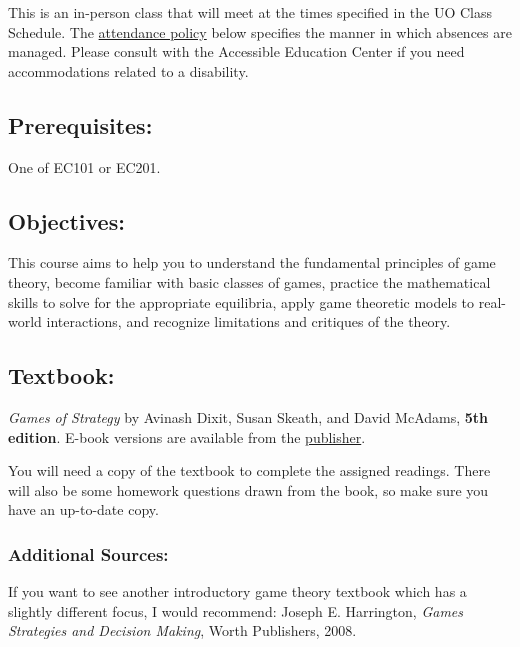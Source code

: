 This is an in-person class that will meet at the times specified in the UO Class Schedule.
The \hyperlink{grade:attendence}{attendance policy} below specifies the manner in which absences are managed.
Please consult with the Accessible Education Center if you need accommodations related to a disability.

\subsection{Prerequisites:}

  One of EC101 or EC201.

\subsection{Objectives:}

This course aims to help you to understand the fundamental principles of game theory, become familiar with basic classes of games, practice the mathematical skills to solve for the appropriate equilibria, apply game theoretic models to real-world interactions, and recognize limitations and critiques of the theory.

\subsection{Textbook:}

  \textit{Games of Strategy} by Avinash Dixit, Susan Skeath, and David McAdams, \textbf{5th edition}.
  E-book versions are available from the \href{https://wwnorton.com/books/Games-of-Strategy}{publisher}.

  You will need a copy of the textbook to complete the assigned readings.
  There will also be some homework questions drawn from the book, so make sure you have an up-to-date copy.
  
  \subsubsection{Additional Sources:}

  If you want to see another introductory game theory textbook which has a slightly different focus,
I would recommend: Joseph E. Harrington, \textit{Games Strategies and Decision Making}, Worth Publishers, 2008.

